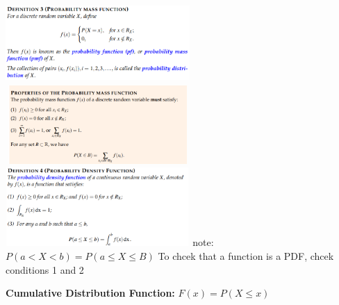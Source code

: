 \documentclass[10pt, landscape]{article}
\begin{document}
\begin{multicols}{4}
\includegraphics[width=7cm, height=3cm]{pmf.png}
\includegraphics[width=7cm, height=3cm]{pmf_properties.png}
\includegraphics[width=7cm, height=3cm]{pdf.png} \newline
note: $P(a<X<b) = P(a\le X \le B)$ \newline
To chcek that a function is a PDF, chcek conditions 1 and 2 \newline

\textbf{Cumulative Distribution Function:} $F(x)=P(X\le x)$ \newline



\textbf{}
\end{multicols}
\end{document}
